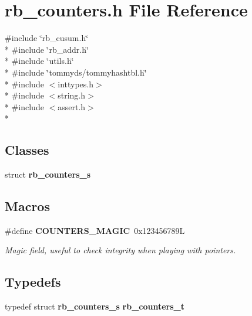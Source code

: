 \section{rb\+\_\+counters.\+h File Reference}
\label{rb__counters_8h}
{\ttfamily \#include \char`\"{}rb\+\_\+cusum.\+h\char`\"{}}\\*
{\ttfamily \#include \char`\"{}rb\+\_\+addr.\+h\char`\"{}}\\*
{\ttfamily \#include \char`\"{}utils.\+h\char`\"{}}\\*
{\ttfamily \#include \char`\"{}tommyds/tommyhashtbl.\+h\char`\"{}}\\*
{\ttfamily \#include $<$inttypes.\+h$>$}\\*
{\ttfamily \#include $<$string.\+h$>$}\\*
{\ttfamily \#include $<$assert.\+h$>$}\\*
\subsection*{Classes}
\begin{DoxyCompactItemize}
\item 
struct {\bf rb\+\_\+counters\+\_\+s}
\end{DoxyCompactItemize}
\subsection*{Macros}
\begin{DoxyCompactItemize}
\item 
\#define {\bf C\+O\+U\+N\+T\+E\+R\+S\+\_\+\+M\+A\+G\+I\+C}~0x123456789\+L
\begin{DoxyCompactList}\small\item\em Magic field, useful to check integrity when playing with pointers. \end{DoxyCompactList}\end{DoxyCompactItemize}
\subsection*{Typedefs}
\begin{DoxyCompactItemize}
\item 
typedef struct {\bf rb\+\_\+counters\+\_\+s} {\bf rb\+\_\+counters\+\_\+t}
\end{DoxyCompactItemize}
